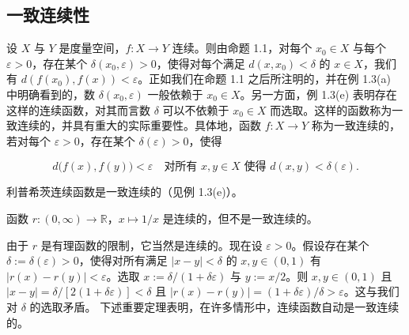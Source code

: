 \subsection*{一致连续性}

设 $X$ 与 $Y$ 是度量空间，$f: X \to Y$ 连续。则由命题 1.1，对每个 $x_0 \in X$ 与每个 $\varepsilon > 0$，存在某个 $\delta(x_0, \varepsilon) > 0$，使得对每个满足 $d(x, x_0) < \delta$ 的 $x \in X$，我们有 $d(f(x_0), f(x)) < \varepsilon$。正如我们在命题 1.1 之后所注明的，并在例 1.3(a) 中明确看到的，数 $\delta(x_0, \varepsilon)$ 一般依赖于 $x_0 \in X$。另一方面，例 1.3(e) 表明存在这样的连续函数，对其而言数 $\delta$ 可以不依赖于 $x_0 \in X$ 而选取。这样的函数称为一致连续的，并具有重大的实际重要性。具体地，函数 $f: X \to Y$ 称为一致连续的，若对每个 $\varepsilon > 0$，存在某个 $\delta(\varepsilon) > 0$，使得

\[
d\big(f(x),f(y)\big)<\varepsilon\quad\text{对所有 }x,y\in X\text{ 使得 }d(x,y)<\delta(\varepsilon).
\]

\begin{example}

\begin{items}
\item

利普希茨连续函数是一致连续的（见例 1.3(e)）。

\item

函数 $ r: (0, \infty) \to \mathbb{R} $，$ x \mapsto 1/x $ 是连续的，但不是一致连续的。

\proofhead
由于 $r$ 是有理函数的限制，它当然是连续的。现在设 $\varepsilon > 0$。假设存在某个 $\delta := \delta(\varepsilon) > 0$，使得对所有满足 $|x - y| < \delta$ 的 $x, y \in (0,1)$ 有 $|r(x) - r(y)| < \varepsilon$。选取 $x := \delta/(1 + \delta\varepsilon)$ 与 $y := x/2$。则 $x, y \in (0,1)$ 且 $|x - y| = \delta/\left[2(1 + \delta\varepsilon)\right] < \delta$ 且 $|r(x) - r(y)| = (1 + \delta\varepsilon)/\delta > \varepsilon$。这与我们对 $\delta$ 的选取矛盾。
下述重要定理表明，在许多情形中，连续函数自动是一致连续的。
\end{items}

\end{example}

